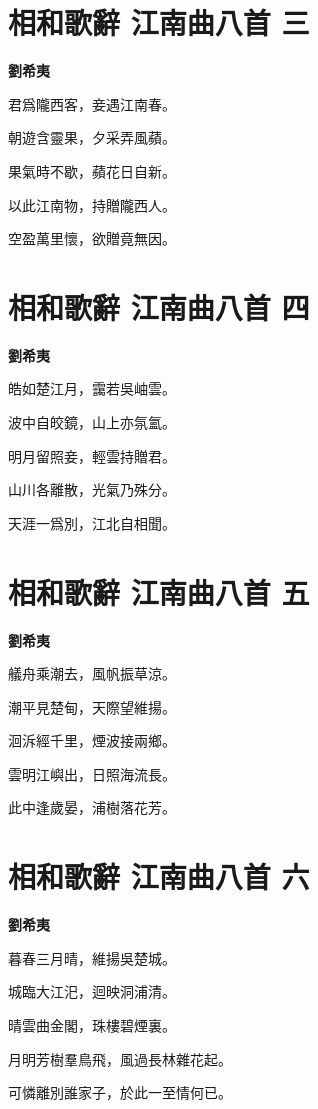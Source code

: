 \documentclass[12pt,a4paper]{ctexbook}
\begin{document}
\section{相和歌辭 江南曲八首 三}
\textbf{劉希夷}\par\vspace{0.5em}
君爲隴西客，妾遇江南春。\par
朝遊含靈果，夕采弄風蘋。\par
果氣時不歇，蘋花日自新。\par
以此江南物，持贈隴西人。\par
空盈萬里懷，欲贈竟無因。\par

\section{相和歌辭 江南曲八首 四}
\textbf{劉希夷}\par\vspace{0.5em}
皓如楚江月，靄若吳岫雲。\par
波中自皎鏡，山上亦氛氳。\par
明月留照妾，輕雲持贈君。\par
山川各離散，光氣乃殊分。\par
天涯一爲別，江北自相聞。\par

\section{相和歌辭 江南曲八首 五}
\textbf{劉希夷}\par\vspace{0.5em}
艤舟乘潮去，風帆振草涼。\par
潮平見楚甸，天際望維揚。\par
洄泝經千里，煙波接兩鄉。\par
雲明江嶼出，日照海流長。\par
此中逢歲晏，浦樹落花芳。\par

\section{相和歌辭 江南曲八首 六}
\textbf{劉希夷}\par\vspace{0.5em}
暮春三月晴，維揚吳楚城。\par
城臨大江汜，迴映洞浦清。\par
晴雲曲金閣，珠樓碧煙裏。\par
月明芳樹羣鳥飛，風過長林雜花起。\par
可憐離別誰家子，於此一至情何已。\par
\end{document}
